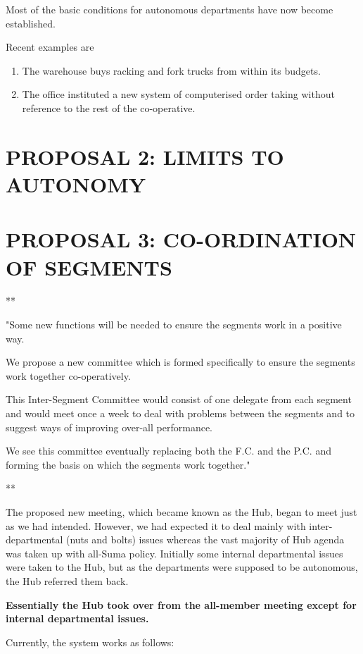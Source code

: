 Most of the basic conditions for autonomous departments have now become established.

Recent examples are

\begin{enumerate}
  \item The warehouse buys racking and fork trucks from within its budgets.

  \item The office instituted a new system of computerised order taking without reference to the rest of the co-operative.

\end{enumerate}

\section*{PROPOSAL 2: LIMITS TO AUTONOMY}

\section*{PROPOSAL 3: CO-ORDINATION OF SEGMENTS}
**

"Some new functions will be needed to ensure the segments work in a positive way.

We propose a new committee which is formed specifically to ensure the segments work together co-operatively.

This Inter-Segment Committee would consist of one delegate from each segment and would meet once a week to deal with problems between the segments and to suggest ways of improving over-all performance.

We see this committee eventually replacing both the F.C. and the P.C. and forming the basis on which the segments work together."

**

The proposed new meeting, which became known as the Hub, began to meet just as we had intended. However, we had expected it to deal mainly with inter-departmental (nuts and bolts) issues whereas the vast majority of Hub agenda was taken up with all-Suma policy. Initially some internal departmental issues were taken to the Hub, but as the departments were supposed to be autonomous, the Hub referred them back.

\textbf{Essentially the Hub took over from the all-member meeting except for internal departmental issues.}

Currently, the system works as follows:

